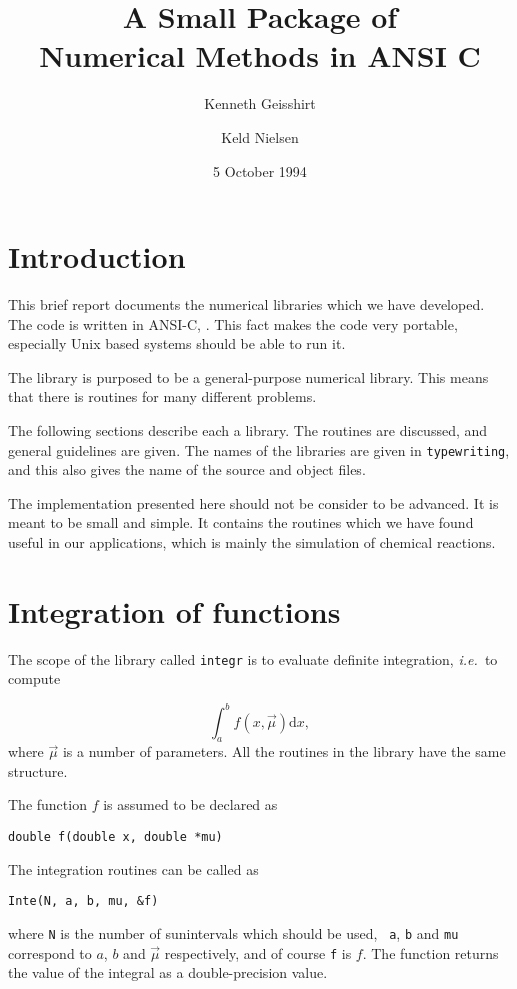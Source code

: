\documentclass[12pt]{article}
\title{A Small Package of \\ Numerical Methods in ANSI C}
\author{Kenneth Geisshirt \and Keld Nielsen}
\date{5 October 1994}
\newcommand{\ie}[0]{{\it i.e.\ \/}}
\begin{document}
\maketitle
\tableofcontents

\section{Introduction}
\label{sec:Intro}

This brief report documents the numerical libraries which we have
developed. The code is written in ANSI-C, \cite{CProgLan}. This fact
makes the code very portable, especially Unix based systems should be
able to run it.

The library is purposed to be a general-purpose numerical library.
This means that there is routines for many different problems. 

The following sections describe each a library. The routines are
discussed, and general guidelines are given. The names of the
libraries are given in {\tt typewriting}, and this also gives the name
of the source and object files.

The implementation presented here should not be consider to be advanced.
It is meant to be small and simple. It contains the routines which we
have found useful in our applications, which is mainly the simulation
of chemical reactions.


\section{Integration of functions}
\label{sec:InteFunc}

The scope of the library called {\tt integr} is to evaluate definite
integration, \ie to compute

\begin{equation}
  \int_a^b f(x, \vec{\mu}) {\mathrm d}x,
\end{equation}
where $\vec{\mu}$ is a number of parameters. All the routines in the
library have the same structure. 

The function $f$ is assumed to be declared as

\begin{verbatim}
double f(double x, double *mu)
\end{verbatim}

The integration routines can be called as

\begin{verbatim}
Inte(N, a, b, mu, &f)
\end{verbatim}
where {\tt N} is the number of sunintervals which should be used, {\tt
  a}, {\tt b} and {\tt mu} correspond to $a$, $b$ and $\vec{\mu}$
respectively, and of course {\tt f} is $f$. The function returns the
value of the integral as a double-precision value.
\end{document}
